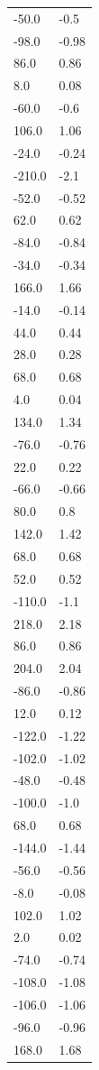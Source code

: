 \begin{longtable}{ll}
-50.0 & -0.5 \\
-98.0 & -0.98 \\
86.0 & 0.86 \\
8.0 & 0.08 \\
-60.0 & -0.6 \\
106.0 & 1.06 \\
-24.0 & -0.24 \\
-210.0 & -2.1 \\
-52.0 & -0.52 \\
62.0 & 0.62 \\
-84.0 & -0.84 \\
-34.0 & -0.34 \\
166.0 & 1.66 \\
-14.0 & -0.14 \\
44.0 & 0.44 \\
28.0 & 0.28 \\
68.0 & 0.68 \\
4.0 & 0.04 \\
134.0 & 1.34 \\
-76.0 & -0.76 \\
22.0 & 0.22 \\
-66.0 & -0.66 \\
80.0 & 0.8 \\
142.0 & 1.42 \\
68.0 & 0.68 \\
52.0 & 0.52 \\
-110.0 & -1.1 \\
218.0 & 2.18 \\
86.0 & 0.86 \\
204.0 & 2.04 \\
-86.0 & -0.86 \\
12.0 & 0.12 \\
-122.0 & -1.22 \\
-102.0 & -1.02 \\
-48.0 & -0.48 \\
-100.0 & -1.0 \\
68.0 & 0.68 \\
-144.0 & -1.44 \\
-56.0 & -0.56 \\
-8.0 & -0.08 \\
102.0 & 1.02 \\
2.0 & 0.02 \\
-74.0 & -0.74 \\
-108.0 & -1.08 \\
-106.0 & -1.06 \\
-96.0 & -0.96 \\
168.0 & 1.68 \\

\end{longtable}
